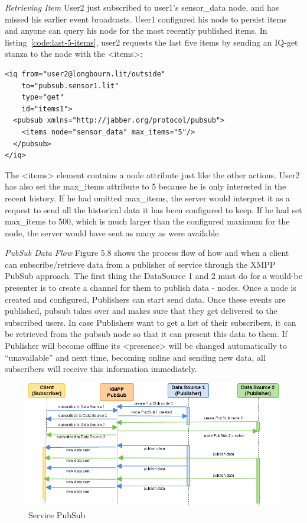 \emph{Retrieving Item}
\newline
User2 just subscribed to user1's sensor\_data node, and has missed his earlier event broadcasts.  User1 configured his node to persist items and anyone can query his node for the most recently published items. In listing~\ref{code:last-5-items}, user2 requests the last five items by sending an IQ-get stanza to the node with the <items>:
\begin{lstlisting}[label=code:last-5-items,caption=PubSub: requesting last 5 items from history]
<iq from="user2@longbourn.lit/outside"
    to="pubsub.sensor1.lit"
    type="get"
    id="items1">
  <pubsub xmlns="http://jabber.org/protocol/pubsub">
    <items node="sensor_data" max_items="5"/>
  </pubsub>
</iq>
\end{lstlisting}
The <items> element contains a node attribute just like the other actions. User2 has also set the max\_items attribute to 5 because he is only interested in the recent history. If he had omitted max\_items, the server would interpret it as a request to send all the historical data it has been configured to keep. If he had set max\_items to 500, which is much larger than the configured maximum for the node, the server would have sent as many as were available.

\emph{PubSub Data Flow}
\newline
Figure 5.8 shows the process flow of how and when a client can subscribe/retrieve data from a publisher of service through the XMPP PubSub approach. The first thing the DataSource 1 and 2 must do for a would-be presenter is to create a channel for them to publish data - nodes. Once a node is created and configured, Publishers can start send data. Once these events are published, pubsub takes over and makes sure that they get delivered to the subscribed users. In case Publishers want to get a list of their subscribers, it can be retrieved from the pubsub node so that it can present this data to them. If Publisher will become offline its <presence> will be changed automatically to ``unavailable'' and next time, becoming online and sending new data, all subscribers will receive this information immediately.
    \begin{figure}[!ht]
    \centering
    \includegraphics[scale=0.6]{images/PubSub.png}   
    \caption[Service PubSub]{Service PubSub}
    \label{img:pub_sub}                           
    \end{figure}
	    
